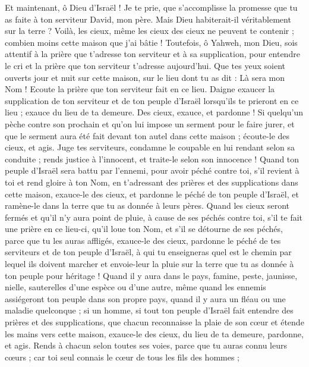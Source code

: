 \begin{multicols}{2}
Et maintenant, ô Dieu d'Israël ! Je te prie, que s’accomplisse la promesse que tu as faite à ton serviteur David, mon père.
Mais Dieu habiterait-il véritablement sur la terre ? Voilà, les cieux, même les cieux des cieux ne peuvent te contenir ; combien moins cette maison que j'ai bâtie !
Toutefois, ô Yahweh, mon Dieu, sois attentif à la prière que t’adresse ton serviteur et à sa supplication, pour entendre le cri et la prière que ton serviteur t’adresse aujourd'hui.
Que tes yeux soient ouverts jour et nuit sur cette maison, sur le lieu dont tu as dit : Là sera mon Nom ! Ecoute la prière que ton serviteur fait en ce lieu.
Daigne exaucer la supplication de ton serviteur et de ton peuple d'Israël lorsqu’ils te prieront en ce lieu ; exauce du lieu de ta demeure. Des cieux, exauce, et pardonne !
Si quelqu'un pèche contre son prochain et qu’on lui impose un serment pour le faire jurer, et que le serment aura été fait devant ton autel dans cette maison ;
écoute-le des cieux, et agis. Juge tes serviteurs, condamne le coupable en lui rendant selon sa conduite ; rends justice à l’innocent, et traite-le selon son innocence !
Quand ton peuple d'Israël sera battu par l'ennemi, pour avoir péché contre toi, s’il revient à toi et rend gloire à ton Nom, en t’adressant des prières et des supplications dans cette maison,
exauce-le des cieux, et pardonne le péché de ton peuple d'Israël, et ramène-le dans la terre que tu as donnée à leurs pères.
Quand les cieux seront fermés et qu'il n'y aura point de pluie, à cause de ses péchés contre toi, s'il te fait une prière en ce lieu-ci, qu’il loue ton Nom, et s’il se détourne de ses péchés, parce que tu les auras affligés,
exauce-le des cieux, pardonne le péché de tes serviteurs et de ton peuple d'Israël, à qui tu enseigneras quel est le chemin par lequel ils doivent marcher et envoie-leur la pluie sur la terre que tu as donnée à ton peuple pour héritage !
Quand il y aura dans le pays, famine, peste, jaunisse, nielle, sauterelles d’une espèce ou d’une autre, même quand les ennemis assiégeront ton peuple dans son propre pays, quand il y aura un fléau ou une maladie quelconque ;
si un homme, si tout ton peuple d'Israël fait entendre des prières et des supplications, que chacun reconnaisse la plaie de son cœur et étende les mains vers cette maison,
exauce-le des cieux, du lieu de ta demeure, pardonne, et agis. Rends à chacun selon toutes ses voies, parce que tu auras connu leurs cœurs ; car toi seul connais le cœur de tous les fils des hommes ;

\end{multicols}
